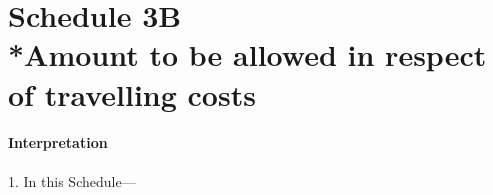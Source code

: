 \documentclass[12pt,a4paper]{article}
\begin{document}
\part[Schedule 3B --- Amount to be allowed in respect of travelling costs]{Schedule 3B\\*Amount to be allowed in respect of travelling costs}

\renewcommand\parthead{--- Schedule 3B}


\subsection*{Interpretation}

1.  In this Schedule—
\end{document}
